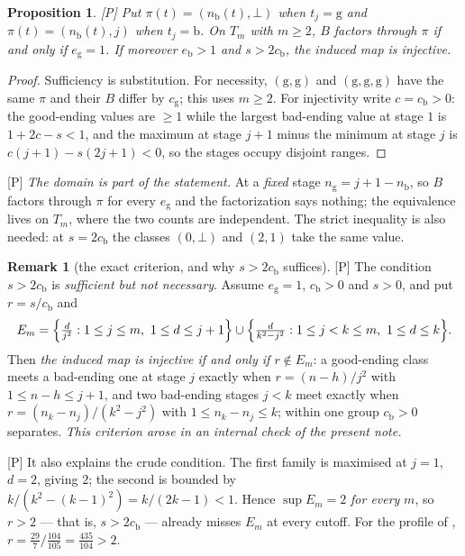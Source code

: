 \documentclass[11pt]{article}
\theoremstyle{plain}
\newtheorem{proposition}[theorem]{Proposition}
\theoremstyle{definition}
\newtheorem{remark}{Remark}
\begin{document}
\begin{proposition}\label{p:statistic}
\textup{[P]} Put $\pi(t)=(n_{\mathrm b}(t),\bot)$ when $t_j=\mathrm g$ and
$\pi(t)=(n_{\mathrm b}(t),j)$ when $t_j=\mathrm b$.  \emph{On $T_m$} with $m\ge2$, $B$
factors through $\pi$ if and only if $e_{\mathrm g}=1$.  If moreover $e_{\mathrm b}>1$
and $s>2c_{\mathrm b}$, the induced map is injective.
\end{proposition}

\begin{proof}
Sufficiency is substitution.  For necessity, $(\mathrm g,\mathrm g)$ and
$(\mathrm g,\mathrm g,\mathrm g)$ have the same $\pi$ and their $B$ differ by
$c_{\mathrm g}$; this uses $m\ge2$.  For injectivity write $c=c_{\mathrm b}>0$: the
good-ending values are $\ge1$ while the largest bad-ending value at stage $1$ is
$1+2c-s<1$, and the maximum at stage $j+1$ minus the minimum at stage $j$ is
$c(j+1)-s(2j+1)<0$, so the stages occupy disjoint ranges.
\end{proof}

\textup{[P]} \emph{The domain is part of the statement.}  At a \emph{fixed} stage
$n_{\mathrm g}=j+1-n_{\mathrm b}$, so $B$ factors through $\pi$ for every
$e_{\mathrm g}$ and the factorization says nothing; the equivalence lives on $T_m$,
where the two counts are independent.  The strict inequality is also needed: at
$s=2c_{\mathrm b}$ the classes $(0,\bot)$ and $(2,1)$ take the same value.

\begin{remark}[the exact criterion, and why $s>2c_{\mathrm b}$ suffices]
\label{r:exact-criterion}
\textup{[P]} The condition $s>2c_{\mathrm b}$ is \emph{sufficient but not necessary}.
Assume $e_{\mathrm g}=1$, $c_{\mathrm b}>0$ and $s>0$, and put $r=s/c_{\mathrm b}$ and
\[
 E_m=\Bigl\{\tfrac{d}{j^{2}}:1\le j\le m,\ 1\le d\le j+1\Bigr\}\cup
      \Bigl\{\tfrac{d}{k^{2}-j^{2}}:1\le j<k\le m,\ 1\le d\le k\Bigr\}.
\]
Then \emph{the induced map is injective
if and only if $r\notin E_m$}: a good-ending class meets a bad-ending one at stage $j$
exactly when $r=(n-h)/j^{2}$ with $1\le n-h\le j+1$, and two bad-ending stages $j<k$
meet exactly when $r=(n_k-n_j)/(k^{2}-j^{2})$ with $1\le n_k-n_j\le k$; within one
group $c_{\mathrm b}>0$ separates.  \emph{This criterion arose in an internal check of the present note.}

\textup{[P]} It also explains the crude condition.  The first family is maximised at
$j=1$, $d=2$, giving $2$; the second is bounded by $k/(k^{2}-(k-1)^{2})=k/(2k-1)<1$.
Hence $\sup E_m=2$ \emph{for every} $m$, so $r>2$ --- that is, $s>2c_{\mathrm b}$ ---
already misses $E_m$ at every cutoff.  For the profile of \cite{Second},
$r=\tfrac{29}{7}\big/\tfrac{104}{105}=\tfrac{435}{104}>2$.
\end{remark}
\end{document}

